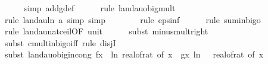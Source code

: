 \begin{isabellebody}
\ \ \ \ \isamarkupfalse%
\ {\isacharparenleft}{\kern0pt}simp\ add{\isacharcolon}{\kern0pt}g{\isacharunderscore}{\kern0pt}def{\isacharparenright}{\kern0pt}\isanewline
\ \ \ \ \isamarkupfalse%
\ {\isacharparenleft}{\kern0pt}rule\ landau{\isacharunderscore}{\kern0pt}o{\isachardot}{\kern0pt}big{\isacharunderscore}{\kern0pt}mult{\isacharunderscore}{\kern0pt}{}{\isacharparenright}{\kern0pt}\isanewline
\ \ \ \ \ \isamarkupfalse%
\ {\isacharparenleft}{\kern0pt}rule\ landau{\isacharunderscore}{\kern0pt}ln{\isacharunderscore}{\kern0pt}{}{\isacharbrackleft}{\kern0pt}\ a{\isacharequal}{\kern0pt}{\isachardoublequoteopen}{}{\isachardoublequoteclose}{\isacharbrackright}{\kern0pt}{\isacharcomma}{\kern0pt}\ simp{\isacharcomma}{\kern0pt}\ simp{\isacharparenright}{\kern0pt}\isanewline
\ \ \ \ \ \ \isamarkupfalse%
\ {\isacharparenleft}{\kern0pt}rule\ eps{\isacharunderscore}{\kern0pt}inf{\isacharparenright}{\kern0pt}\isanewline
\ \ \ \ \isamarkupfalse%
\ {\isacharparenleft}{\kern0pt}rule\ sum{\isacharunderscore}{\kern0pt}in{\isacharunderscore}{\kern0pt}bigo{\isacharparenright}{\kern0pt}\isanewline
\ \ \ \ \ \ \isamarkupfalse%
\ {\isacharparenleft}{\kern0pt}rule\ landau{\isacharunderscore}{\kern0pt}nat{\isacharunderscore}{\kern0pt}ceil{\isacharbrackleft}{\kern0pt}OF\ unit{\isacharunderscore}{\kern0pt}{}{\isacharbrackright}{\kern0pt}{\isacharparenright}{\kern0pt}\isanewline
\ \ \ \ \isamarkupfalse%
\ {\isacharparenleft}{\kern0pt}subst\ minus{\isacharunderscore}{\kern0pt}mult{\isacharunderscore}{\kern0pt}right{\isacharparenright}{\kern0pt}\isanewline
\ \ \ \ \ \ \isamarkupfalse%
\ {\isacharparenleft}{\kern0pt}subst\ cmult{\isacharunderscore}{\kern0pt}in{\isacharunderscore}{\kern0pt}bigo{\isacharunderscore}{\kern0pt}iff{\isacharcomma}{\kern0pt}\ rule\ disjI{}{\isacharparenright}{\kern0pt}\isanewline
\ \ \ \ \ \ \isamarkupfalse%
\ {\isacharparenleft}{\kern0pt}subst\ landau{\isacharunderscore}{\kern0pt}o{\isachardot}{\kern0pt}big{\isachardot}{\kern0pt}in{\isacharunderscore}{\kern0pt}cong{\isacharbrackleft}{\kern0pt}\ f{\isacharequal}{\kern0pt}{\isachardoublequoteopen}{\isasymlambda}x{\isachardot}{\kern0pt}\ {\isacharminus}{\kern0pt}\ ln\ {\isacharparenleft}{\kern0pt}real{\isacharunderscore}{\kern0pt}of{\isacharunderscore}{\kern0pt}rat\ {\isacharparenleft}{\kern0pt}{\isasymepsilon}{\isacharunderscore}{\kern0pt}of\ x{\isacharparenright}{\kern0pt}{\isacharparenright}{\kern0pt}{\isachardoublequoteclose}\ \ g{\isacharequal}{\kern0pt}{\isachardoublequoteopen}{\isasymlambda}x{\isachardot}{\kern0pt}\ ln\ {\isacharparenleft}{\kern0pt}{}\ {\isacharslash}{\kern0pt}\ real{\isacharunderscore}{\kern0pt}of{\isacharunderscore}{\kern0pt}rat\ {\isacharparenleft}{\kern0pt}{\isasymepsilon}{\isacharunderscore}{\kern0pt}of\ x{\isacharparenright}{\kern0pt}{\isacharparenright}{\kern0pt}{\isachardoublequoteclose}{\isacharbrackright}{\kern0pt}{\isacharparenright}{\kern0pt}\isanewline

\end{isabellebody}
